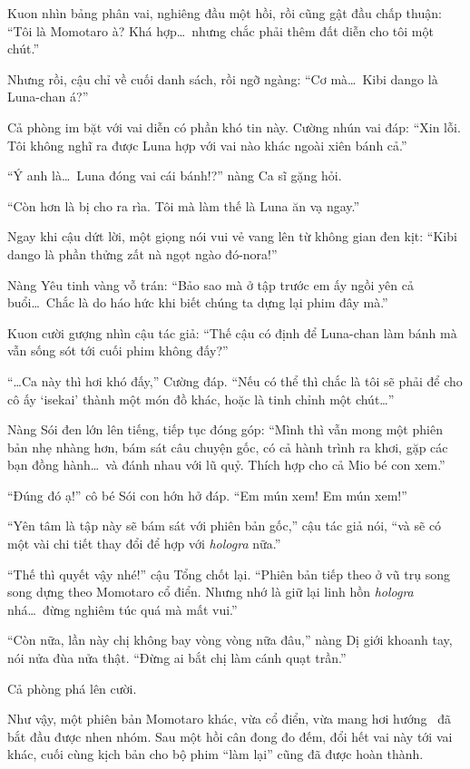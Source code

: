 \documentclass[../main.tex]{subfiles}
\begin{document}
Kuon nhìn bảng phân vai, nghiêng đầu một hồi, rồi cũng gật đầu chấp thuận: ``Tôi là Momotaro à? Khá hợp\dots\ nhưng chắc phải thêm đất diễn cho tôi một chút.''

Nhưng rồi, cậu chỉ về cuối danh sách, rồi ngỡ ngàng: ``Cơ mà\dots\ Kibi dango là Luna-chan á?''

Cả phòng im bặt với vai diễn có phần khó tin này. Cường nhún vai đáp: ``Xin lỗi. Tôi không nghĩ ra được Luna hợp với vai nào khác ngoài xiên bánh cả.''

``Ý anh là\dots\ Luna đóng vai cái bánh!?'' nàng Ca sĩ gặng hỏi.

``Còn hơn là bị cho ra rìa. Tôi mà làm thế là Luna ăn vạ ngay.''

Ngay khi cậu dứt lời, một giọng nói vui vẻ vang lên từ không gian đen kịt: ``Kibi dango là phần thửng zất nà ngọt ngào đó-nora!''

Nàng Yêu tinh vàng vỗ trán: ``Bảo sao mà ở tập trước em ấy ngồi yên cả buổi\dots\ Chắc là do háo hức khi biết chúng ta dựng lại phim đây mà.''

Kuon cười gượng nhìn cậu tác giả: ``Thế cậu có định để Luna-chan làm bánh mà vẫn sống sót tới cuối phim không đấy?''

``\dots Ca này thì hơi khó đấy,'' Cường đáp. ``Nếu có thể thì chắc là tôi sẽ phải để cho cô ấy `isekai' thành một món đồ khác, hoặc là tinh chỉnh một chút\dots''

Nàng Sói đen lớn lên tiếng, tiếp tục đóng góp: ``Mình thì vẫn mong một phiên bản nhẹ nhàng hơn, bám sát câu chuyện gốc, có cả hành trình ra khơi, gặp các bạn đồng hành\dots\ và đánh nhau với lũ quỷ. Thích hợp cho cả Mio bé con xem.''

``Đúng  đó ạ!'' cô bé Sói con hớn hở đáp. ``Em mún xem! Em mún xem!''

``Yên tâm là tập này sẽ bám sát với phiên bản gốc,'' cậu tác giả nói, ``và sẽ có một vài chi tiết thay đổi để hợp với \textit{hologra} nữa.''

``Thế thì quyết vậy nhé!'' cậu Tổng chốt lại. ``Phiên bản tiếp theo ở vũ trụ song song dựng theo Momotaro cổ điển. Nhưng nhớ là giữ lại linh hồn \textit{hologra} nhá\dots\ đừng nghiêm túc quá mà mất vui.''

``Còn nữa, lần này chị không bay vòng vòng nữa đâu,'' nàng Dị giới khoanh tay, nói nửa đùa nửa thật. ``Đừng ai bắt chị làm cánh quạt trần.''

Cả phòng phá lên cười.

Như vậy, một phiên bản Momotaro khác, vừa cổ điển, vừa mang hơi hướng \hll\ đã bắt đầu được nhen nhóm. Sau một hồi cân đong đo đếm, đổi hết vai này tới vai khác, cuối cùng kịch bản cho bộ phim ``làm lại'' cũng đã được hoàn thành.
\end{document}
